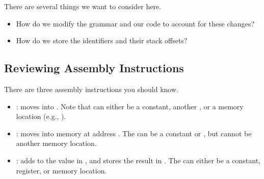 \documentclass[letterpaper]{article}
\begin{document}
There are several things we want to consider here.
\begin{itemize}
    \item How do we modify the grammar and our code to account for these changes?
    \item How do we store the identifiers and their stack offsets? 
\end{itemize}

\subsection{Reviewing Assembly Instructions}
There are three assembly instructions you should know.
\begin{itemize}
    \item {}: moves  into . Note that  can either be a constant, another , or a memory location (e.g., \code{[rsp - X]}).
    \item {}: moves  into memory at address . The  can be a constant or , but cannot be another memory location. 
    \item {}: adds  to the value in , and stores the result in . The  can either be a constant, register, or memory location.  
\end{itemize}
\end{document}
